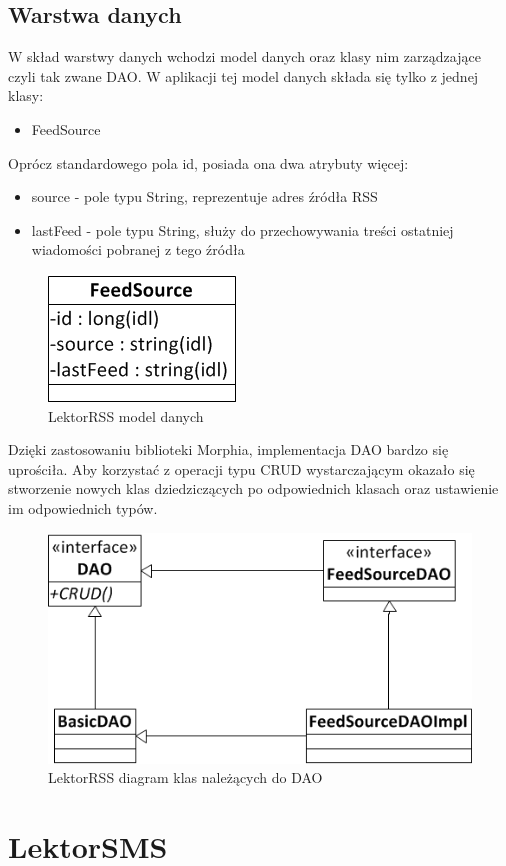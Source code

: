 \subsection{Warstwa danych}
W skład warstwy danych wchodzi model danych oraz klasy nim zarządzające czyli tak zwane DAO. W aplikacji tej model danych składa się tylko z jednej klasy:
\begin{itemize}
	\item FeedSource
\end{itemize}
Oprócz standardowego pola id, posiada ona dwa atrybuty więcej:
\begin{itemize}
	\item source - pole typu String, reprezentuje adres źródła RSS
	\item lastFeed - pole typu String, służy do przechowywania treści ostatniej wiadomości pobranej z tego źródła
\end{itemize}
\begin{figure}[!h]
	\centering
	\includegraphics[scale=0.65]{FeedSourceDiagram.png} 
	\caption{LektorRSS model danych}
\end{figure}
\newpage
Dzięki zastosowaniu biblioteki Morphia, implementacja DAO bardzo się uprościła. Aby korzystać z operacji typu CRUD wystarczającym okazało się stworzenie nowych klas dziedziczących po odpowiednich klasach oraz ustawienie im odpowiednich typów. 
\begin{figure}[!h]
	\centering
	\includegraphics[scale=0.65]{LektorRSSDiagramKlasDAO.png} 
	\caption{LektorRSS diagram klas należących do DAO}
\end{figure}

\section{LektorSMS}





